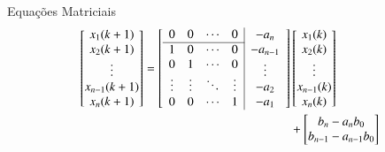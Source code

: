 Equações Matriciais
    \begin{eqnarray} \label{eq:modeloARMAXsisoSS}
        \begin{aligned}
            \centering
                 \begin{bmatrix}
                    x_1(k+1)\\ 
                    x_2(k+1)\\
                    \vdots\\
                    x_{n-1}(k+1)\\ 
                    x_{n}(k+1)
                \end{bmatrix}
                                          =
                \left[\begin{array}{c c c c|}
                  0 & 0 & \cdots & 0 \\
                 \hline
                 1&0 &\cdots &0 \\
                 0&1 &\cdots &0 \\
                 \vdots&\vdots &\ddots &\vdots \\
                 0&0 &\cdots &1 \\
                \end{array}
                \begin{array}{c}
                     -a_n      \\
                      -a_{n-1}      \\
                     \vdots\\
                     -a_2\\
                     -a_1
                \end{array}
                \right]&
                \begin{bmatrix}
                    x_1(k)\\ 
                    x_2(k)\\
                    \vdots\\
                    x_{n-1}(k)\\ 
                    x_n(k)
                \end{bmatrix}
                                            \\&+
                \begin{bmatrix}
                     b_n-a_nb_0\\
                   b_{n-1}-a_{n-1}b_0\\ 

\end{bmatrix}
\end{aligned}
\end{eqnarray}
